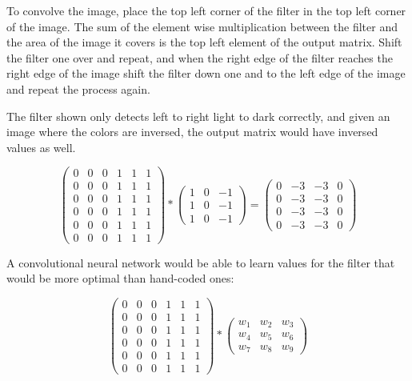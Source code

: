 \documentclass[12pt]{article}
\begin{document}
To convolve the image, place the top left corner of the filter in the top left corner of
the image. The sum of the element wise multiplication between the filter and the area of
the image it covers is the top left element of the output matrix. Shift the filter one over
and repeat, and when the right edge of the filter reaches the right edge of the image shift
the filter down one and to the left edge of the image and repeat the process again.

The filter shown only detects left to right light to dark correctly, and given an image where
the colors are inversed, the output matrix would have inversed values as well.

\[
    \begin{pmatrix}
        0 & 0 & 0 & 1 & 1 & 1\\
        0 & 0 & 0 & 1 & 1 & 1\\
        0 & 0 & 0 & 1 & 1 & 1\\
        0 & 0 & 0 & 1 & 1 & 1\\
        0 & 0 & 0 & 1 & 1 & 1\\
        0 & 0 & 0 & 1 & 1 & 1
    \end{pmatrix}
    *
    \begin{pmatrix}
        1 & 0 & -1\\
        1 & 0 & -1\\
        1 & 0 & -1
    \end{pmatrix}
    =
    \begin{pmatrix}
        0 & -3 & -3 & 0\\
        0 & -3 & -3 & 0\\
        0 & -3 & -3 & 0\\
        0 & -3 & -3 & 0
    \end{pmatrix}
\]

A convolutional neural network would be able to learn values for the filter that would be
more optimal than hand-coded ones:

\[
    \begin{pmatrix}
        0 & 0 & 0 & 1 & 1 & 1\\
        0 & 0 & 0 & 1 & 1 & 1\\
        0 & 0 & 0 & 1 & 1 & 1\\
        0 & 0 & 0 & 1 & 1 & 1\\
        0 & 0 & 0 & 1 & 1 & 1\\
        0 & 0 & 0 & 1 & 1 & 1
    \end{pmatrix}
    *
    \begin{pmatrix}
        w_1 & w_2 & w_3\\
        w_4 & w_5 & w_6\\
        w_7 & w_8 & w_9
    \end{pmatrix}
\]
\end{document}
